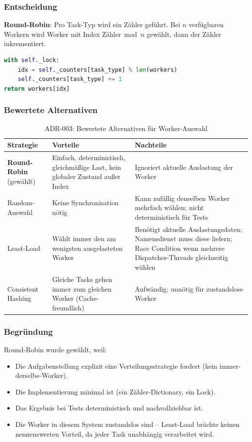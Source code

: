 \subsubsection*{Entscheidung}

\textbf{Round-Robin}: Pro Task-Typ wird ein Zähler geführt.
Bei $n$ verfügbaren Workern wird Worker mit Index $\text{Zähler} \bmod n$
gewählt, dann der Zähler inkrementiert.

\begin{lstlisting}[language=Python,caption={Round-Robin-Implementierung}]
with self._lock:
    idx = self._counters[task_type] % len(workers)
    self._counters[task_type] += 1
return workers[idx]
\end{lstlisting}

\subsubsection*{Bewertete Alternativen}

\begin{table}[H]
\centering
\begin{tabular}{lp{5cm}p{5cm}}
\toprule
\textbf{Strategie} & \textbf{Vorteile} & \textbf{Nachteile} \\
\midrule
\textbf{Round-Robin} (gewählt) &
  Einfach, deterministisch, gleichmäßige Last, kein globaler Zustand außer Index &
  Ignoriert aktuelle Auslastung der Worker \\
\midrule
Random-Auswahl &
  Keine Synchronisation nötig &
  Kann zufällig denselben Worker mehrfach wählen; nicht deterministisch für Tests \\
\midrule
Least-Load &
  Wählt immer den am wenigsten ausgelasteten Worker &
  Benötigt aktuelle Auslastungsdaten; Namensdienst muss diese liefern;
  Race Condition wenn mehrere Dispatcher-Threads gleichzeitig wählen \\
\midrule
Consistent Hashing &
  Gleiche Tasks gehen immer zum gleichen Worker (Cache-freundlich) &
  Aufwändig; unnötig für zustandslose Worker \\
\bottomrule
\end{tabular}
\caption{ADR-003: Bewertete Alternativen für Worker-Auswahl}
\end{table}

\subsubsection*{Begründung}

Round-Robin wurde gewählt, weil:
\begin{itemize}
  \item Die Aufgabenstellung explizit eine Verteilungsstrategie fordert
        (kein immer-derselbe-Worker).
  \item Die Implementierung minimal ist (ein Zähler-Dictionary, ein Lock).
  \item Das Ergebnis bei Tests deterministisch und nachvollziehbar ist.
  \item Die Worker in diesem System zustandslos sind -- Least-Load
        brächte keinen nennenswerten Vorteil, da jeder Task unabhängig
        verarbeitet wird.
\end{itemize}

